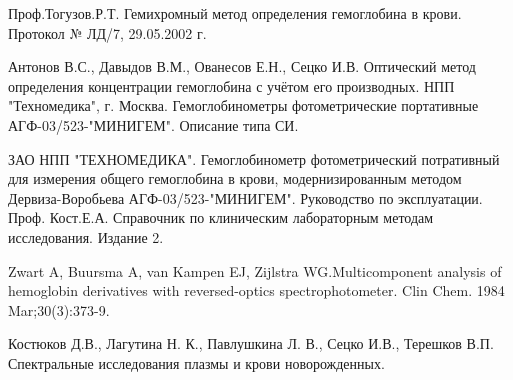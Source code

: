 \documentclass[14pt,a4paper]{scrartcl}
\begin{document}
\clearpage
\newpage
\begin{thebibliography}{9}

 Проф.Тогузов.Р.Т. Гемихромный метод определения гемоглобина в крови. Протокол № ЛД/7, 29.05.2002 г.


 Антонов В.С., Давыдов В.М., Ованесов Е.Н., Сецко И.В. Оптический метод определения концентрации гемоглобина с учётом его производных. НПП "Техномедика", г. Москва.
 Гемоглобинометры фотометрические портативные АГФ-03/523-"МИНИГЕМ". Описание типа СИ.

 ЗАО НПП "ТЕХНОМЕДИКА". Гемоглобинометр фотометрический потративный для измерения общего гемоглобина в крови, модернизированным методом Дервиза-Воробьева АГФ-03/523-"МИНИГЕМ". Руководство по эксплуатации.
 Проф. Кост.Е.А. Справочник по клиническим лабораторным методам исследования. Издание 2.

 Zwart A, Buursma A, van Kampen EJ, Zijlstra WG.Multicomponent analysis of hemoglobin derivatives with reversed-optics spectrophotometer. Clin Chem. 1984 Mar;30(3):373-9.

 Костюков Д.В., Лагутина Н. К., Павлушкина Л. В., Сецко И.В., Терешков В.П. Спектральные исследования плазмы и крови новорожденных.
\end{thebibliography}
\end{document}
